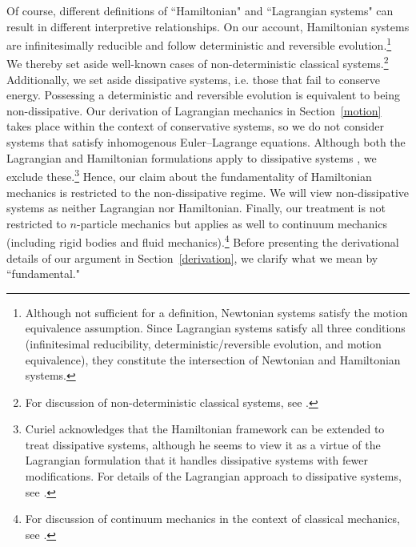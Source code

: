 \documentclass[letterpaper]{article}
\begin{document}
Of course, different definitions of ``Hamiltonian" and ``Lagrangian systems" can result in different interpretive relationships. On our account, Hamiltonian systems are infinitesimally reducible and follow deterministic and reversible evolution.\footnote{Although not sufficient for a definition, Newtonian systems satisfy the motion equivalence assumption. Since Lagrangian systems satisfy all three conditions (infinitesimal reducibility, deterministic/reversible evolution, and motion equivalence), they constitute the intersection of Newtonian and Hamiltonian systems.} We thereby set aside well-known cases of non-deterministic classical systems.\footnote{For discussion of non-deterministic classical systems, see \textcites*[3-4]{Baez}{Earman}{Norton}.} Additionally, we set aside dissipative systems, i.e. those that fail to conserve energy. Possessing a deterministic and reversible evolution is equivalent to being non-dissipative. Our derivation of Lagrangian mechanics in Section~\ref{motion} takes place within the context of conservative systems, so we do not consider systems that satisfy inhomogenous Euler--Lagrange equations. Although both the Lagrangian and Hamiltonian formulations apply to dissipative systems \parencites[\S 10.4]{Cline}, we exclude these.\footnote{Curiel \parencites*[311]{Curiel} acknowledges that the Hamiltonian framework can be extended to treat dissipative systems, although he seems to view it as a virtue of the Lagrangian formulation that it handles dissipative systems with fewer modifications. For details of the Lagrangian approach to dissipative systems, see \textcites[]{Smith}.} Hence, our claim about the fundamentality of Hamiltonian mechanics is restricted to the non-dissipative regime. We will view non-dissipative systems as neither Lagrangian nor Hamiltonian. Finally, our treatment is not restricted to $n$-particle mechanics but applies as well to continuum mechanics (including rigid bodies and fluid mechanics).\footnote{For discussion of continuum mechanics in the context of classical mechanics, see \textcites[]{Wilson}.} Before presenting the derivational details of our argument in Section~\ref{derivation}, we clarify what we mean by ``fundamental."

\end{document}
